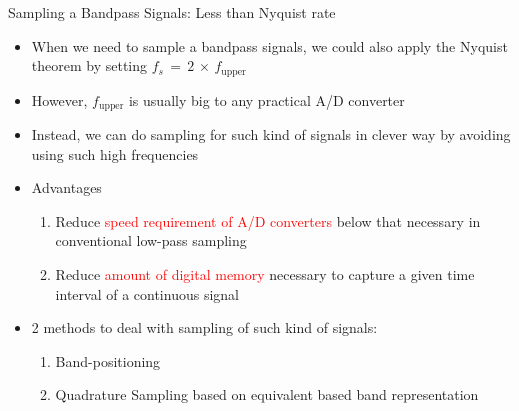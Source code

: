 \documentclass{beamer}
\begin{document}
\begin{frame}[t]{Sampling a Bandpass Signals: Less than Nyquist rate}

\begin{itemize}

\item When we need to sample a bandpass signals, we could also apply the Nyquist theorem by setting $f_s \, = \, 2 \, \times \, f_{\text{upper}}$

\item However, $f_{\text{upper}}$ is usually big to any practical A/D converter

\item Instead, we can do sampling for such kind of signals in clever way by avoiding using such high frequencies


\item Advantages \cite{book_understanding_dsp}

	\begin{enumerate}
	\item Reduce \textcolor{red}{speed requirement of A/D converters} below that necessary in conventional low-pass sampling
	
	\item Reduce \textcolor{red}{amount of digital memory }necessary to capture a given time interval of a continuous signal
	\end{enumerate}


\item 2 methods to deal with sampling of such kind of signals:


	\begin{enumerate}
	\item Band-positioning
	
	\item Quadrature Sampling based on equivalent based band representation
	
	\end{enumerate}


\end{itemize}

\end{frame}
\end{document}
